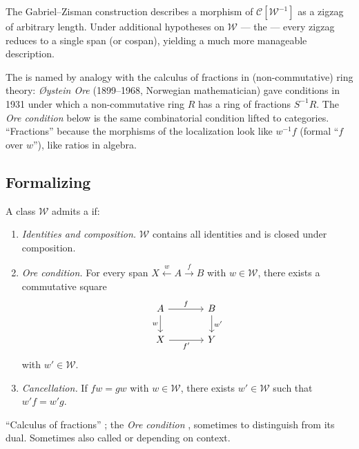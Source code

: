 The Gabriel--Zisman construction describes a morphism of
$\mathcal{C}[\mathcal{W}^{-1}]$ as a zigzag of arbitrary length. Under
additional hypotheses on $\mathcal{W}$ — the 
— every zigzag reduces to a single span (or cospan), yielding a much
more manageable description.

\begin{nameorigin}
The  is named by analogy with the
calculus of fractions in (non-commutative) ring theory: \emph{Øystein
Ore} (1899--1968, Norwegian mathematician) gave conditions in 1931
under which a non-commutative ring $R$ has a ring of fractions
$S^{-1} R$. The \emph{Ore condition} below is the same combinatorial
condition lifted to categories. ``Fractions'' because the morphisms of
the localization look like $w^{-1} f$ (formal ``$f$ over $w$''), like
ratios in algebra.
\end{nameorigin}

\subsection{Formalizing}

\begin{definition}
\label{def:left-fractions}
A class $\mathcal{W}$ admits a  if:
\begin{enumerate}
  \item \emph{Identities and composition.} $\mathcal{W}$ contains all
        identities and is closed under composition.
  \item \emph{Ore condition.} For every span $X \xleftarrow{w} A
        \xrightarrow{f} B$ with $w \in \mathcal{W}$, there exists a
        commutative square
        \begin{equation*}
          \begin{tikzcd}[column sep=large]
            A \arrow[r, "f"] \arrow[d, "w"'] & B \arrow[d, "w'"] \\
            X \arrow[r, "f'"'] & Y
          \end{tikzcd}
        \end{equation*}
        with $w' \in \mathcal{W}$.
  \item \emph{Cancellation.} If $fw = gw$ with $w \in \mathcal{W}$,
        there exists $w' \in \mathcal{W}$ such that $w'f = w'g$.
\end{enumerate}
\end{definition}

\begin{howtosay}
``Calculus of fractions'' ; the
\emph{Ore condition} ,
sometimes  to distinguish from its
dual. Sometimes also called  or
 depending on context.
\end{howtosay}


